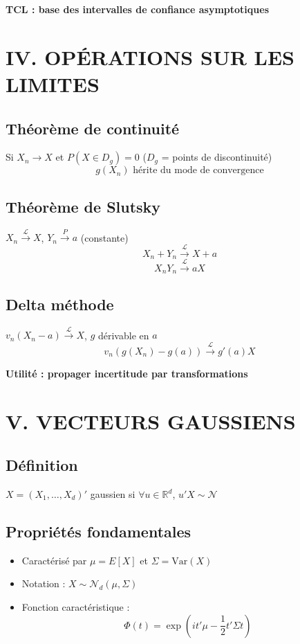 \documentclass[8pt,twocolumn]{article}
\newcommand{\mydef}[1]{\textcolor{defcolor}{\textbf{#1}}}
\newcommand{\mythm}[1]{\textcolor{thmcolor}{\textbf{#1}}}
\newcommand{\myprop}[1]{\textcolor{propcolor}{\textbf{#1}}}
\newcommand{\myrem}[1]{\textcolor{remcolor}{\textbf{#1}}}
\begin{document}
\myrem{TCL : base des intervalles de confiance asymptotiques}

\section*{\mydef{IV. OPÉRATIONS SUR LES LIMITES}}

\subsection{\mythm{Théorème de continuité}}
Si $X_n \to X$ et $P(X \in D_g) = 0$ ($D_g$ = points de discontinuité)
$$g(X_n) \text{ hérite du mode de convergence}$$

\subsection{\mythm{Théorème de Slutsky}}
$X_n \xrightarrow{\mathcal{L}} X$, $Y_n \xrightarrow{P} a$ (constante)
$$X_n + Y_n \xrightarrow{\mathcal{L}} X + a$$
$$X_n Y_n \xrightarrow{\mathcal{L}} aX$$

\subsection{\mythm{Delta méthode}}
$v_n(X_n - a) \xrightarrow{\mathcal{L}} X$, $g$ dérivable en $a$
$$v_n(g(X_n) - g(a)) \xrightarrow{\mathcal{L}} g'(a)X$$

\myrem{Utilité : propager incertitude par transformations}

\section*{\mydef{V. VECTEURS GAUSSIENS}}

\subsection{Définition}
$X = (X_1,\ldots,X_d)'$ gaussien si $\forall u \in \mathbb{R}^d$, $u'X \sim \mathcal{N}$

\subsection{\myprop{Propriétés fondamentales}}
\begin{itemize}[nosep]
\item Caractérisé par $\mu = E[X]$ et $\Sigma = \text{Var}(X)$
\item Notation : $X \sim \mathcal{N}_d(\mu, \Sigma)$
\item Fonction caractéristique : 
$$\Phi(t) = \exp(it'\mu - \frac{1}{2}t'\Sigma t)$$
\end{itemize}
\end{document}
